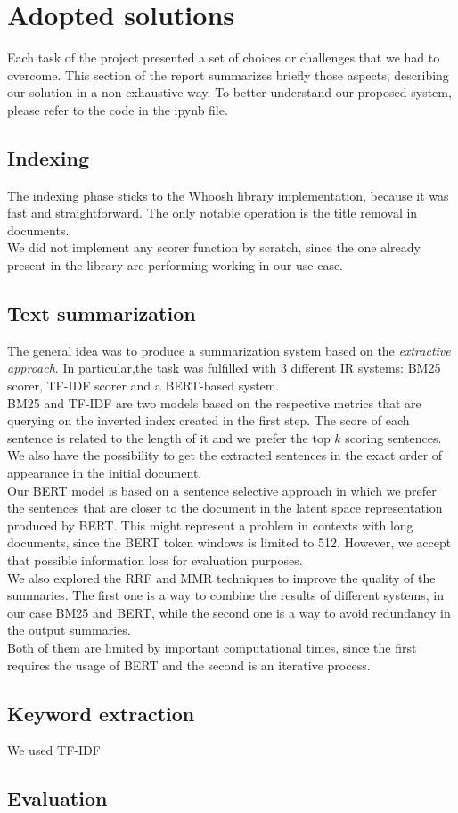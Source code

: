 \section{Adopted solutions}
Each task of the project presented a set of choices or challenges that we had to overcome. This section of the report summarizes briefly those aspects, describing our solution in a non-exhaustive way. To better understand our proposed system, please refer to the code in the ipynb file.

\subsection{Indexing}
The indexing phase sticks to the Whoosh library implementation, because it was fast and straightforward. The only notable operation is the title removal in documents.\\
We did not implement any scorer function by scratch, since the one already present in the library are performing working in our use case.  
\subsection{Text summarization}
The general idea was to produce a summarization system based on the \emph{extractive approach}. In particular,the task was fulfilled with 3 different IR systems: BM25 scorer, TF-IDF scorer and a BERT-based system.\\
BM25 and TF-IDF are two models based on the respective metrics that are querying on the inverted index created in the first step. The score of each sentence is related to the length of it and we prefer the top $k$ scoring sentences. We also have the possibility to get the extracted sentences in the exact order of appearance in the initial document.\\ Our BERT model is based on a sentence selective approach in which we prefer the sentences that are closer to the document in the latent space representation produced by BERT. This might represent a problem in contexts with long documents, since the BERT token windows is limited to 512. However, we accept that possible information loss for evaluation purposes.\\
We also explored the RRF and MMR techniques to improve the quality of the summaries. The first one is a way to combine the results of different systems, in our case BM25 and BERT, while the second one is a way to avoid redundancy in the output summaries.\\ Both of them are limited by important computational times, since the first requires the usage of BERT and the second is an iterative process.

\subsection{Keyword extraction}
We used TF-IDF 

\subsection{Evaluation}